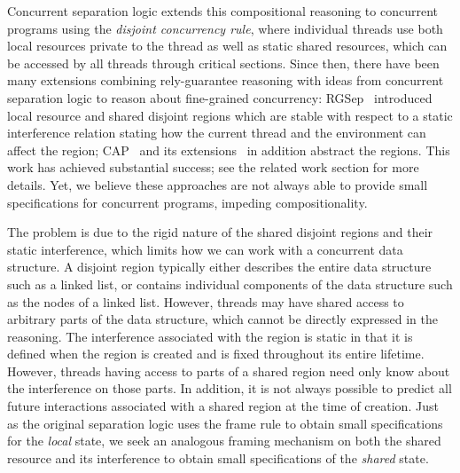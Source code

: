 Concurrent separation logic extends this compositional reasoning to
concurrent programs using the {\em disjoint concurrency rule}, where
individual threads use both local resources private to the
thread as well as static shared resources, which can be accessed by
all threads through critical sections. Since then, there have been many
extensions combining rely-guarantee reasoning with ideas from
concurrent separation logic to reason about fine-grained concurrency:
RGSep~\cite{viktor-marriage} 
introduced local resource and shared disjoint
regions which are stable with respect to a static interference
relation stating how the current thread and the environment can affect
the region; CAP~\cite{cap-ecoop10} and its
extensions~\cite{hocap,icap,tada} in addition abstract the
regions. This work has achieved substantial success; see the related
work section for more details. Yet, we believe these approaches
are not always able to provide small
specifications for concurrent programs, impeding 
compositionality.



The problem is due to the rigid nature of the shared disjoint regions and
their static interference, which   limits how we can  work
with a
concurrent data structure. A disjoint region typically either describes 
the entire data structure such as a linked list,  or contains
individual 
components of the data structure such as the nodes of a
linked list. However, threads may have shared access to arbitrary 
parts of the data structure, which cannot be directly expressed in the reasoning.
The interference associated with the region is static in that it is defined when
the region is created and is fixed throughout its entire lifetime. However, 
threads having access to parts of a shared region need only know about the interference on those parts. In addition, 
it is not always possible
to predict all future interactions  associated with  a shared
region at the time  of creation. Just as the original separation logic  uses the frame rule to
obtain small specifications for the \emph{local} state, we seek an
analogous framing mechanism on both the {shared} resource  {and} its
interference to obtain small
specifications of the \emph{shared} state. 


